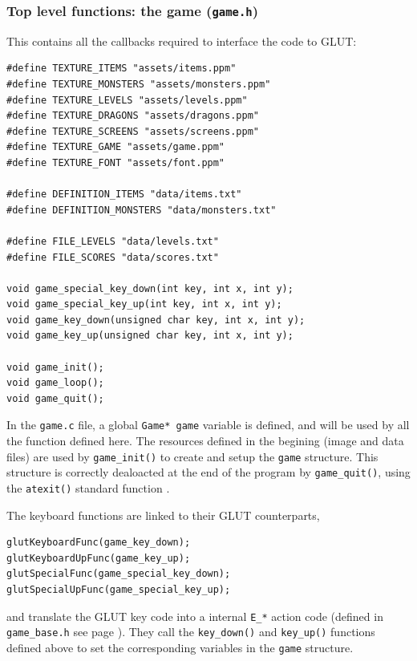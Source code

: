 \documentclass[12pt,a4paper]{article}
\newcommand{\cc}[1]{\texttt{#1}}
\begin{document}
\subsubsection{Top level functions: the game (\texttt{game.h})}

This contains all the callbacks required to interface the code to GLUT:\begin{verbatim}
#define TEXTURE_ITEMS "assets/items.ppm"
#define TEXTURE_MONSTERS "assets/monsters.ppm"
#define TEXTURE_LEVELS "assets/levels.ppm"
#define TEXTURE_DRAGONS "assets/dragons.ppm"
#define TEXTURE_SCREENS "assets/screens.ppm"
#define TEXTURE_GAME "assets/game.ppm"
#define TEXTURE_FONT "assets/font.ppm"

#define DEFINITION_ITEMS "data/items.txt"
#define DEFINITION_MONSTERS "data/monsters.txt"

#define FILE_LEVELS "data/levels.txt"
#define FILE_SCORES "data/scores.txt"

void game_special_key_down(int key, int x, int y);
void game_special_key_up(int key, int x, int y);
void game_key_down(unsigned char key, int x, int y);
void game_key_up(unsigned char key, int x, int y);

void game_init();
void game_loop();
void game_quit();
\end{verbatim}

In the \cc{game.c} file, a global \cc{Game* game} variable is defined, and will be used by all the function defined here. The resources defined in the begining (image and data files) are used by \cc{game_init()} to create and setup the \cc{game} structure. This structure is correctly dealoacted at the end of the program by \cc{game_quit()}, using the \cc{atexit()} standard function \cite{cppref}.

The keyboard functions are linked to their GLUT counterparts, \begin{verbatim}
glutKeyboardFunc(game_key_down);
glutKeyboardUpFunc(game_key_up);
glutSpecialFunc(game_special_key_down);
glutSpecialUpFunc(game_special_key_up);
\end{verbatim}
and translate the GLUT key code into a internal \cc{E_*} action code (defined in \texttt{game\_base.h} see page \pageref{p:ekey}). They call the \cc{key_down()} and \cc{key_up()} functions defined above to set the corresponding variables in the \cc{game} structure.
\end{document}
